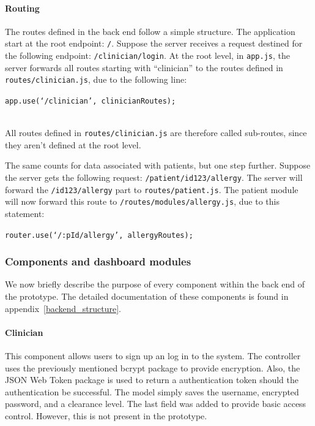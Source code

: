         \paragraph{Routing} The routes defined in the back end follow a simple structure. The application start at the root endpoint: \texttt{/}. Suppose the server receives a request destined for the following endpoint: \texttt{/clinician/login}. At the root level, in \texttt{app.js}, the server forwards all routes starting with ``clinician'' to the routes defined in \texttt{routes/clinician.js}, due to the following line:\\
        \centerline{\texttt{app.use(`/clinician', clinicianRoutes);}}\\ %
        All routes defined in \texttt{routes/clinician.js} are therefore called sub-routes, since they aren't defined at the root level.\medskip

        \noindent The same counts for data associated with patients, but one step further. Suppose the server gets the following request: \texttt{/patient/id123/allergy}. The server will forward the \texttt{/id123/allergy} part to \texttt{routes/patient.js}. The patient module will now forward this route to \texttt{/routes/modules/allergy.js}, due to this statement:\\
        \centerline{\texttt{router.use(`/:pId/allergy', allergyRoutes);}} %
        
        \subsubsection{Components and dashboard modules}

        We now briefly describe the purpose of every component within the back end of the prototype. The detailed documentation of these components is found in appendix~\ref{backend_structure}.

            \paragraph{Clinician} This component allows users to sign up an log in to the system. The controller uses the previously mentioned bcrypt package to provide encryption. Also, the JSON Web Token package is used to return a authentication token should the authentication be successful. The model simply saves the username, encrypted password, and a clearance level. The last field was added to provide basic access control. However, this is not present in the prototype.

